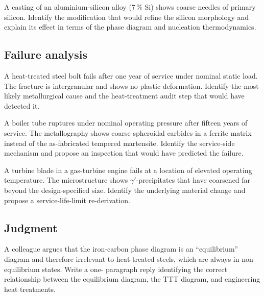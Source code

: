 \begin{exercise}
A casting of an aluminium-silicon alloy ($7\,\%$ Si) shows coarse
needles of primary silicon. Identify the modification that would
refine the silicon morphology and explain its effect in terms of the
phase diagram and nucleation thermodynamics.
\end{exercise}

\subsection*{Failure analysis}

\begin{exercise}
A heat-treated steel bolt fails after one year of service under
nominal static load. The fracture is intergranular and shows no
plastic deformation. Identify the most likely metallurgical cause
and the heat-treatment audit step that would have detected it.
\end{exercise}

\begin{exercise}
A boiler tube ruptures under nominal operating pressure after
fifteen years of service. The metallography shows coarse spheroidal
carbides in a ferrite matrix instead of the as-fabricated tempered
martensite. Identify the service-side mechanism and propose an
inspection that would have predicted the failure.
\end{exercise}

\begin{exercise}
A turbine blade in a gas-turbine engine fails at a location of
elevated operating temperature. The microstructure shows
$\gamma'$-precipitates that have coarsened far beyond the
design-specified size. Identify the underlying material change and
propose a service-life-limit re-derivation.
\end{exercise}

\subsection*{Judgment}

\begin{exercise}
A colleague argues that the iron-carbon phase diagram is an
``equilibrium'' diagram and therefore irrelevant to heat-treated
steels, which are always in non-equilibrium states. Write a one-
paragraph reply identifying the correct relationship between the
equilibrium diagram, the TTT diagram, and engineering heat treatments.
\end{exercise}

